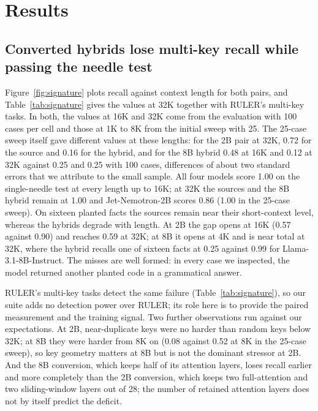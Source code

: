\documentclass[11pt]{article}
\begin{document}
\section{Results}
\label{sec:results}

\subsection{Converted hybrids lose multi-key recall while passing the needle test}
\label{sec:results-signature}
Figure~\ref{fig:signature} plots recall against context length for both pairs, and Table~\ref{tab:signature} gives the values at 32K together with RULER's multi-key tasks. In both, the values at 16K and 32K come from the evaluation with 100 cases per cell and those at 1K to 8K from the initial sweep with 25. The 25-case sweep itself gave different values at these lengths: for the 2B pair at 32K, 0.72 for the source and 0.16 for the hybrid, and for the 8B hybrid 0.48 at 16K and 0.12 at 32K against 0.25 and 0.25 with 100 cases, differences of about two standard errors that we attribute to the small sample. All four models score 1.00 on the single-needle test at every length up to 16K; at 32K the sources and the 8B hybrid remain at 1.00 and Jet-Nemotron-2B scores 0.86 (1.00 in the 25-case sweep). On sixteen planted facts the sources remain near their short-context level, whereas the hybrids degrade with length. At 2B the gap opens at 16K (0.57 against 0.90) and reaches 0.59 at 32K; at 8B it opens at 4K and is near total at 32K, where the hybrid recalls one of sixteen facts at 0.25 against 0.99 for Llama-3.1-8B-Instruct. The misses are well formed: in every case we inspected, the model returned another planted code in a grammatical answer.

RULER's multi-key tasks detect the same failure (Table~\ref{tab:signature}), so our suite adds no detection power over RULER; its role here is to provide the paired measurement and the training signal. Two further observations run against our expectations. At 2B, near-duplicate keys were no harder than random keys below 32K; at 8B they were harder from 8K on (0.08 against 0.52 at 8K in the 25-case sweep), so key geometry matters at 8B but is not the dominant stressor at 2B. And the 8B conversion, which keeps half of its attention layers, loses recall earlier and more completely than the 2B conversion, which keeps two full-attention and two sliding-window layers out of 28; the number of retained attention layers does not by itself predict the deficit.
\end{document}
